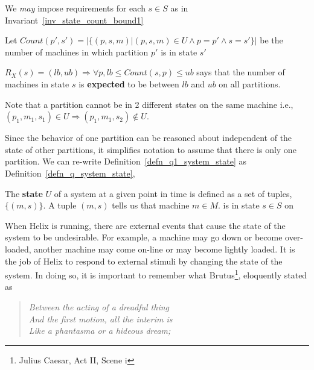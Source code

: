 We {\it may} impose requirements for each \(s
\in S\) as in Invariant~\ref{inv_state_count_bound1}
\begin{definition}
Let \(Count(p', s') = |\{(p, s, m) | (p, s, m) \in U \wedge p = p' \wedge s =
s'\}|\) be the number of machines in which partition \(p'\) is in state
\(s'\)
\end{definition}


\begin{invariant}
\label{inv_state_count_bound1}
\(R_X(s) = (lb, ub) \Rightarrow \forall p, lb \leq Count(s, p) \leq ub
\) says that the number of machines in state \(s\) is {\bf expected} to
be between \(lb\) and \(ub\) on all partitions.
\end{invariant}

\begin{invariant}
\label{inv_one_state_for_one_partition_on_one_machine}
Note that a partition cannot be in 2 different states on the same
machine i.e., \((p_1, m_1, s_1) \in U \Rightarrow (p_1, m_1, s_2) \not
\in U\).
\end{invariant}

Since the behavior of
one partition can be reasoned about independent of the state of other
partitions, it simplifies notation to assume that there is only one
partition. We can 
re-write Definition~\ref{defn_q1_system_state} as 
Definition~\ref{defn_q_system_state}, 

\begin{definition}
\label{defn_q_system_state}
The {\bf state} \(U\) of a system at a given point in time
is defined as a set of tuples, 
\(\{(m, s)\} \).  A tuple \((m, s)\) tells us that
machine \(m \in M\).  is in state \(s \in S\) on 
\end{definition}

When Helix is running, there are external events that cause the state of
the system to be undesirable. For example, a machine may go down or
become over-loaded, another machine may come on-line or may become
lightly loaded. It is the job of Helix to respond to external stimuli by
changing the state of the system. In doing so, it is important to
remember what Brutus\footnote{Julius Caesar, Act II, Scene i},  
eloquently stated as 
\begin{verse}
{\em 
Between the acting of a dreadful thing \\
And the first motion, all the interim is \\ 
Like a phantasma or a hideous dream; \\
}
\end{verse}

